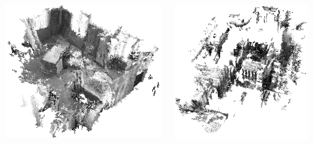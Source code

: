 \documentclass[28pt, a4paper, landscape]{tikzposter}
\begin{document}
\begin{columns}
{\begin{minipage}[t]{0.24\linewidth}
\begin{tikzfigure}
  \centering
  \includegraphics[width=\linewidth]{../img/v1-greyscale.png}
\end{tikzfigure}
\end{minipage}
\hfill
\begin{minipage}[t]{0.24\linewidth}
\begin{tikzfigure}
  \centering
  \includegraphics[width=\linewidth]{../img/euroc_mh_02.png}

\end{tikzfigure}
\end{minipage}}
\end{columns}
\end{document}

